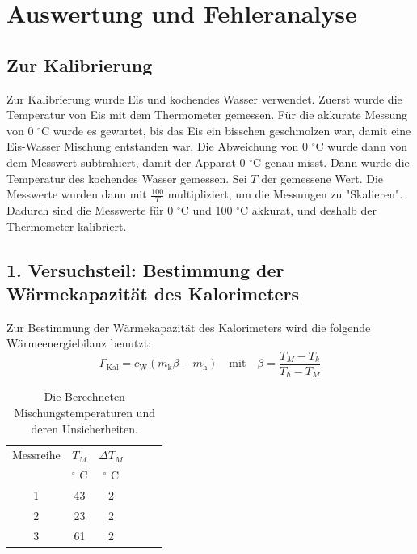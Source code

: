 \documentclass[11pt,a4paper]{article} %
\begin{document}
\section{Auswertung und Fehleranalyse}

\subsection{Zur Kalibrierung}
Zur Kalibrierung wurde Eis und kochendes Wasser verwendet. Zuerst wurde die Temperatur von Eis mit dem Thermometer gemessen. Für die akkurate Messung von 0 $^\circ$C wurde es gewartet, bis das Eis ein bisschen geschmolzen war, damit eine Eis-Wasser Mischung entstanden war. Die Abweichung von 0 $^\circ$C wurde dann von dem Messwert subtrahiert, damit der Apparat 0 $^\circ$C genau misst. Dann wurde die Temperatur des kochendes Wasser gemessen. Sei $T$ der gemessene Wert. Die Messwerte wurden dann mit $\frac{100}{T}$ multipliziert, um die Messungen zu "Skalieren". Dadurch sind die Messwerte für 0 $^\circ$C und 100 $^\circ$C akkurat, und deshalb der Thermometer kalibriert. 

\subsection{1. Versuchsteil: Bestimmung der Wärmekapazität des Kalorimeters}

Zur Bestimmung der Wärmekapazität des Kalorimeters wird die folgende Wärmeenergiebilanz benutzt:
\begin{equation}
 \Gamma_\textrm{Kal} = c_\textrm{W}(m_\textrm{k}\beta-m_\textrm{h})  \quad \textrm{mit} \quad \beta = \frac{T_M-T_k}{T_h-T_M}
\end{equation}
\begin{table}[h]
	\centering
	\begin{tabular*}{0.99\textwidth}{@{\extracolsep{\fill}}cccccc}
		\toprule
		Messreihe & $T_M$ & $\Delta T_M$  \\
		& $^\circ$ C & $^\circ$ C \\
		1 & 43 & 2  \\
		2 & 23 & 2 \\
		3 & 61 & 2 \\
		\bottomrule
	\end{tabular*}
	\caption{Die Berechneten Mischungstemperaturen und deren Unsicherheiten.}
	\label{tabelle}
\end{table}
\end{document}
